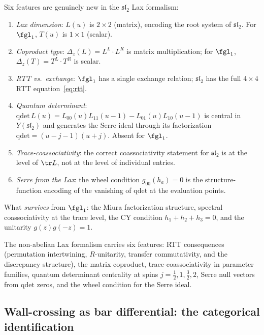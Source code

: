 \begin{remark}
\label{rem:gl1-vs-sl2-lax}
Six features are genuinely new in the $\mathfrak{sl}_2$ Lax formalism:
\begin{enumerate}[label=(\roman*)]
\item \emph{Lax dimension}: $L(u)$ is $2 \times 2$ (matrix),
 encoding the root system of $\mathfrak{sl}_2$.
 For $\fgl_1$, $T(u)$ is $1 \times 1$ (scalar).
\item \emph{Coproduct type}: $\Delta_z(L) = L^L \cdot L^R$ is matrix
 multiplication; for $\fgl_1$, $\Delta_z(T) = T^L \cdot T^R$ is scalar.
\item \emph{RTT vs.\ exchange}: $\fgl_1$ has a single exchange relation;
 $\mathfrak{sl}_2$ has the full $4 \times 4$ RTT
 equation~\eqref{eq:rtt}.
\item \emph{Quantum determinant}: $\mathrm{qdet}\, L(u) = L_{00}(u) L_{11}(u-1)
 - L_{01}(u) L_{10}(u-1)$ is central in $Y(\mathfrak{sl}_2)$ and
 generates the Serre ideal through its factorization
 $\mathrm{qdet} = (u - j - 1)(u + j)$. Absent for $\fgl_1$.
\item \emph{Trace-coassociativity}: the correct coassociativity
 statement for $\mathfrak{sl}_2$ is at the level of $\tr L$, not
 at the level of individual entries.
\item \emph{Serre from the Lax}: the wheel condition
 $g_{00}(h_a) = 0$ is the structure-function
 encoding of the vanishing of $\mathrm{qdet}$ at the evaluation points.
\end{enumerate}
What \emph{survives} from $\fgl_1$: the Miura factorization structure,
spectral coassociativity at the trace level, the CY condition
$h_1 + h_2 + h_3 = 0$, and the unitarity $g(z) g(-z) = 1$.
\end{remark}

\begin{remark}
\label{rem:matrix-lax-verification}
The non-abelian Lax formalism carries six features: RTT consequences
(permutation intertwining, $R$-unitarity, transfer commutativity, and
the discrepancy structure), the matrix coproduct, trace-coassociativity
in parameter families, quantum determinant centrality at spins
$j=\tfrac12,1,\tfrac32,2$, Serre null vectors from $\mathrm{qdet}$
zeros, and the wheel condition for the Serre ideal.
\end{remark}

\subsection{Wall-crossing as bar differential: the categorical identification}
\label{sec:categorical-wall-crossing-bar}


